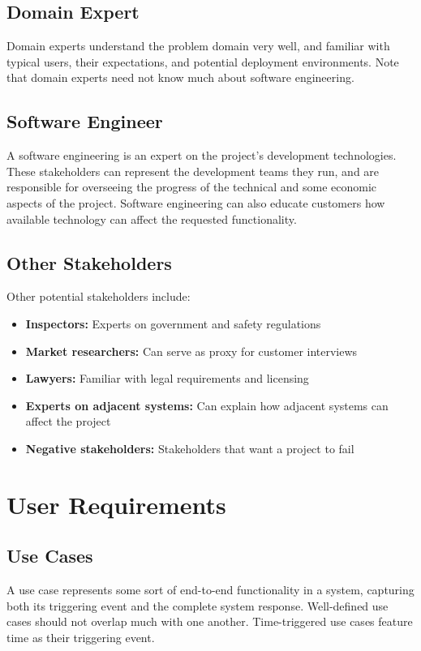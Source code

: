 \documentclass[12pt,titlepage]{article}
\begin{document}
    \subsection{Domain Expert}
      Domain experts understand the problem domain very well, and familiar with typical users, their expectations, and potential deployment environments.
      Note that domain experts need not know much about software engineering.

    \subsection{Software Engineer}
      A software engineering is an expert on the project's development technologies. These stakeholders can represent the development teams they run, and
      are responsible for overseeing the progress of the technical and some economic aspects of the project. Software engineering can also educate customers
      how available technology can affect the requested functionality.

    \subsection{Other Stakeholders}
      Other potential stakeholders include:
      \begin{itemize}
        \item \textbf{Inspectors:} Experts on government and safety regulations
        \item \textbf{Market researchers:} Can serve as proxy for customer interviews
        \item \textbf{Lawyers:} Familiar with legal requirements and licensing
        \item \textbf{Experts on adjacent systems:} Can explain how adjacent systems can affect the project
        \item \textbf{Negative stakeholders:} Stakeholders that want a project to fail
      \end{itemize}

  \section{User Requirements}

    \subsection{Use Cases}
      A use case represents some sort of end-to-end functionality in a system, capturing both its triggering event and the complete system response. Well-defined
      use cases should not overlap much with one another. Time-triggered use cases feature time as their triggering event.
\end{document}
